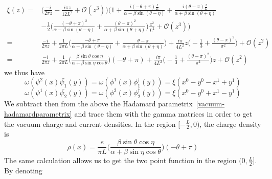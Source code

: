 \begin{equation}\label{nef-xi}
\begin{split}
\xi(z) = & \Big( \frac{-i}{2 \pi z} - \frac{i \pi z}{12L^2} + \mathcal{O}(z^3) \Big)
\Big( 1 + \frac{i(-\theta + \pi)\frac{z}{L}}{\alpha - \beta\sin(\theta - \eta)} + \frac{i(\theta - \pi)\frac{z}{L}}{\alpha + \beta\sin(\theta + \eta)}  \\
& - \frac{1}{2}\Big(\frac{(-\theta + \pi)^2}{\alpha - \beta \sin (\theta - \eta)}  
+ \frac{(\theta - \pi)^2}{\alpha + \beta \sin (\theta + \eta)} \Big)\frac{z^2}{L^2}
+  \mathcal{O}(z^3) \Big)  \\
= & \frac{-i}{2 \pi z} + \frac{1}{2\pi L}\Big( \frac{-\theta + \pi}{\alpha - \beta\sin(\theta - \eta)} + \frac{\theta - \pi}{\alpha + \beta\sin(\theta + \eta)} \Big)  
 + \frac{i\pi}{4 L^2}z \big( -\frac{1}{3} + \frac{(\theta - \pi)^2}{\pi^2}\big) + \mathcal{O}(z^2) \\
= &  \frac{-i}{2 \pi z} 
+ \frac{1}{2\pi L}\Big( \frac{\beta \sin \theta \cos \eta}{\alpha + \beta \sin \eta \cos \theta}\Big) (-\theta + \pi) 
+ \frac{i\pi}{4 L^2}\big( -\frac{1}{3} + \frac{(\theta - \pi)^2}{\pi^2}\big)z+ \mathcal{O}(z^2)
\end{split}
\end{equation}
we thus have
\begin{equation*}
\omega(\psi^2(x) \bar{\psi_1}(y)) = \omega(\phi^1(x) \phi^\dagger_1(y)) 
= \xi( x^0 - y^0 - x^1 +y^1)
\end{equation*}
\begin{equation*}
\omega(\psi^1(x) \bar{\psi_2}(y)) =  \omega(\phi^2(x) \phi^\dagger_2(y)) 
= \xi(x^0 - y^0 + x^1 -y^1)
\end{equation*}
We subtract then from the above the Hadamard parametrix~\cref{vacuum-hadamardparametrix} and trace them with the gamma matrices in order to get the vacuum charge and current densities.
In the region $[-\frac{L}{2}, 0)$, the charge density is
\begin{equation}
\rho(x) = \frac{e}{\pi L}\Big( \frac{\beta \sin \theta \cos \eta}{\alpha + \beta \sin \eta \cos \theta}\Big) (-\theta + \pi)
\end{equation}
The same calculation allows us to get the two point function in the region $(0, \frac{L}{2}]$. By denoting

